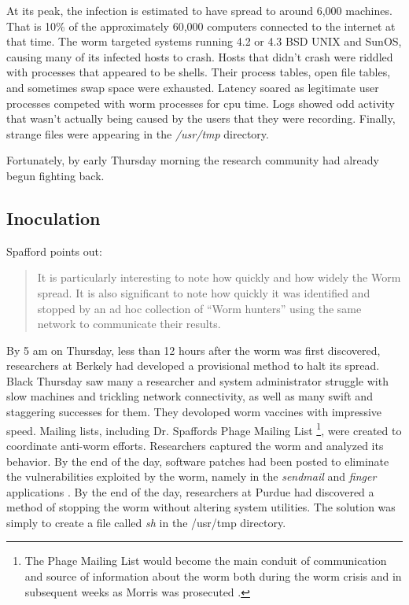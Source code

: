 At its peak, the infection is estimated to have spread to around 6,000 machines.
That is 10\% of the approximately 60,000 computers connected to the internet at
that time\cite{eichin_microscope_1989}\cite{marsan_morris_2008}. The worm
targeted systems running 4.2 or 4.3 BSD UNIX and SunOS, causing many of its
infected hosts to crash.
Hosts that didn't crash were riddled with processes that appeared to be shells.
Their process tables, open file tables, and sometimes swap space were exhausted.
Latency soared as legitimate user processes competed with worm processes for cpu
time. Logs showed odd activity that wasn't actually being caused by the
users that they were recording. Finally, strange files were appearing in the
\textit{/usr/tmp} directory\cite{seeley_tour_1989}\cite{spafford_crisis_1989}.

Fortunately, by early Thursday morning the research community had already begun
fighting back.



\subsection*{Inoculation}

Spafford\cite{spafford_internet_1989-1} points out:
\begin{quote}
It is particularly interesting to note how quickly and how widely the Worm spread.
It is also significant to note how quickly it was identified and stopped by an
ad hoc collection of ``Worm hunters'' using the same network to communicate their
results.
\end{quote}

By 5 am on Thursday, less than 12 hours after the
worm was first discovered, researchers at Berkely had
developed a provisional method to halt its spread\cite{spafford_crisis_1989}.
Black Thursday saw many a researcher and system administrator struggle
with slow machines and trickling network connectivity, as well as 
many swift and staggering successes for them.
They devoloped worm vaccines with impressive speed. 
Mailing lists, including Dr. Spaffords Phage Mailing List
\footnote{
The Phage Mailing List would become the main conduit of communication and source
of information about the worm both during the worm crisis and in subsequent weeks as Morris
was prosecuted
\cite{spafford_crisis_1989}\cite{spafford_internet_1989-1}\cite{lee_washpost_2013}.
}, 
were created to coordinate anti-worm efforts.
Researchers captured the worm and analyzed its behavior. By the end of the day,
software patches had been posted to eliminate the vulnerabilities exploited by
the worm, namely in the \textit{sendmail} and \textit{finger} applications
\cite{spafford_crisis_1989}
\cite{seeley_tour_1989}. By the end of the
day, researchers at Purdue had discovered a
method of stopping the worm without altering
system utilities\cite{spafford_internet_1989-1}. The solution was simply to
create a file called \textit{sh} in the /usr/tmp directory.

